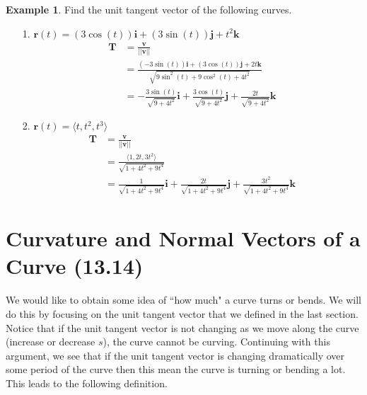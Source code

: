 \documentclass[12pt, letter]{article}
\theoremstyle{plain}
\numberwithin{theorem}{section}
\theoremstyle{definition}
\newtheorem{example}[theorem]{Example}
\begin{document}
\begin{example}
Find the unit tangent vector of the following curves.\\
\begin{itemize}
\item[1.] $\bm{r}(t) = (3\cos(t))\bm{i}+(3\sin(t))\bm{j}+t^2\bm{k}$
\begin{align*}
\bm{T} &= \frac{\bm{v}}{||\bm{v}||}\\
&= \frac{(-3\sin(t))\bm{i}+(3\cos(t))\bm{j}+2t\bm{k}}{\sqrt{9\sin^2(t)+9\cos^2(t)+4t^2}}\\
&= -\frac{3\sin(t)}{\sqrt{9+4t^2}}\bm{i}+\frac{3\cos(t)}{\sqrt{9+4t^2}}\bm{j}+\frac{2t}{\sqrt{9+4t^2}}\bm{k}
\end{align*}
\item[2.] $\bm{r}(t) = \langle t,t^2,t^3 \rangle$
\begin{align*}
\bm{T} &= \frac{\bm{v}}{||\bm{v}||}\\
&= \frac{\langle 1, 2t, 3t^2 \rangle}{\sqrt{1+4t^2+9t^4}}\\
&= \frac{1}{\sqrt{1+4t^2+9t^4}}\bm{i}+\frac{2t}{\sqrt{1+4t^2+9t^4}}\bm{j}+\frac{3t^2}{\sqrt{1+4t^2+9t^4}}\bm{k}
\end{align*}
\end{itemize}
\end{example}

\newpage


\section{Curvature and Normal Vectors of a Curve (13.14)}

We would like to obtain some idea of ``how much" a curve turns or bends. We will do this by focusing on the unit tangent vector that we defined in the last section. Notice that if the unit tangent vector is not changing as we move along the curve (increase or decrease $s$), the curve cannot be curving. Continuing with this argument, we see that if the unit tangent vector is changing dramatically over some period of the curve then this mean the curve is turning or bending a lot. This leads to the following definition.

\bigskip
\end{document}
